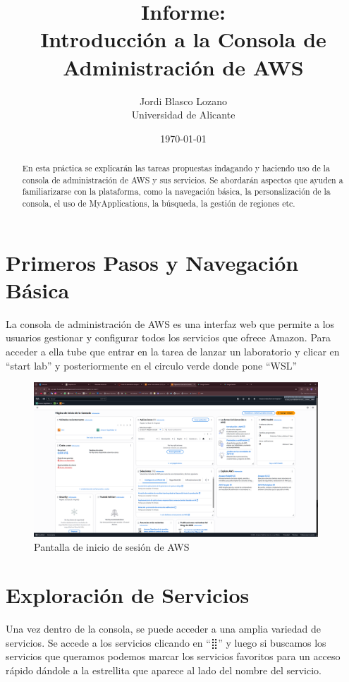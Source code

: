 \documentclass{article}
\title{Informe: \\ Introducción a la Consola de Administración de AWS}
\author{
	Jordi Blasco Lozano \\
	\small Universidad de Alicante
}
\date{\today}
\begin{document}
	
	\maketitle

	\begin{abstract}
	\noindent En esta práctica se explicarán las tareas propuestas indagando y haciendo uso de la consola de administración de AWS y sus servicios. Se abordarán aspectos que ayuden a familiarizarse con la plataforma, como la navegación básica, la personalización de la consola, el uso de MyApplications, la búsqueda, la gestión de regiones etc.
	\end{abstract}

	\tableofcontents

	\newpage

	\section{Primeros Pasos y Navegación Básica}

	La consola de administración de AWS es una interfaz web que permite a los usuarios gestionar y configurar todos los servicios que ofrece Amazon. Para acceder a ella tube que entrar en la tarea de lanzar un laboratorio y clicar en ``start lab'' y posteriormente en el circulo verde donde pone ``WSL''

	\begin{figure}[h!]
	\centering
	\includegraphics[width=0.95\textwidth]{tarea_1.png}
	\caption{Pantalla de inicio de sesión de AWS}
	\end{figure}

	\section{Exploración de Servicios}

	Una vez dentro de la consola, se puede acceder a una amplia variedad de servicios. Se accede a los servicios clicando en ``⣿'' y luego si buscamos los servicios que queramos podemos marcar los servicios favoritos para un acceso rápido dándole a la estrellita que aparece al lado del nombre del servicio.
\end{document}
